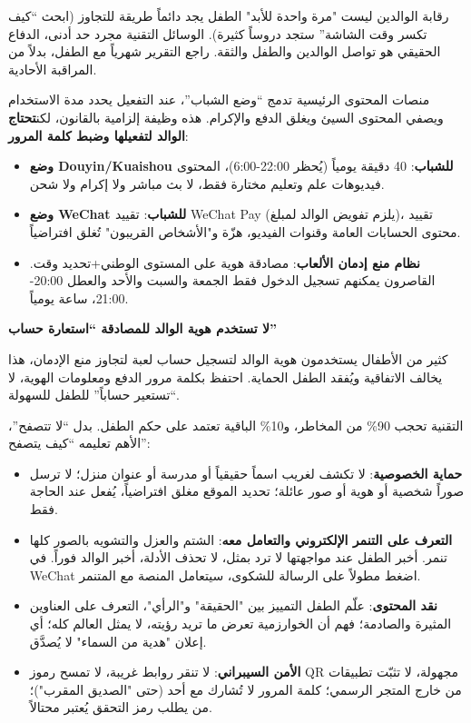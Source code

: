 \begin{tcbwarn}{رقابة الوالدين ليست "مرة واحدة للأبد"}
الطفل يجد دائماً طريقة للتجاوز (ابحث “كيف تكسر وقت الشاشة” ستجد دروساً كثيرة). الوسائل التقنية مجرد حد أدنى، الدفاع الحقيقي هو تواصل الوالدين والطفل والثقة. راجع التقرير شهرياً مع الطفل، بدلاً من المراقبة الأحادية.

\end{tcbwarn}


منصات المحتوى الرئيسية تدمج “وضع الشباب”، عند التفعيل يحدد مدة الاستخدام ويصفي المحتوى السيئ ويغلق الدفع والإكرام. هذه وظيفة إلزامية بالقانون، لكن\textbf{تحتاج الوالد لتفعيلها وضبط كلمة المرور}:

\begin{itemize}
  \item \textbf{وضع Douyin/Kuaishou للشباب}: 40 دقيقة يومياً (يُحظر 22:00-6:00)، المحتوى فيديوهات علم وتعليم مختارة فقط، لا بث مباشر ولا إكرام ولا شحن.
  \item \textbf{وضع WeChat للشباب}: تقييد WeChat Pay (يلزم تفويض الوالد لمبلغ)، تقييد محتوى الحسابات العامة وقنوات الفيديو، هزّة و"الأشخاص القريبون" تُغلق افتراضياً.
  \item \textbf{نظام منع إدمان الألعاب}: مصادقة هوية على المستوى الوطني+تحديد وقت. القاصرون يمكنهم تسجيل الدخول فقط الجمعة والسبت والأحد والعطل 20:00-21:00، ساعة يومياً.
\end{itemize}

\textbf{لا تستخدم هوية الوالد للمصادقة “استعارة حساب”}\par

كثير من الأطفال يستخدمون هوية الوالد لتسجيل حساب لعبة لتجاوز منع الإدمان، هذا يخالف الاتفاقية ويُفقد الطفل الحماية. احتفظ بكلمة مرور الدفع ومعلومات الهوية، لا “تستعير حساباً” للطفل للسهولة.


التقنية تحجب 90\% من المخاطر، و10\% الباقية تعتمد على حكم الطفل. بدل “لا تتصفح”، الأهم تعليمه “كيف يتصفح”:

\begin{itemize}
  \item \textbf{حماية الخصوصية}: لا تكشف لغريب اسماً حقيقياً أو مدرسة أو عنوان منزل؛ لا ترسل صوراً شخصية أو هوية أو صور عائلة؛ تحديد الموقع مغلق افتراضياً، يُفعل عند الحاجة فقط.
  \item \textbf{التعرف على التنمر الإلكتروني والتعامل معه}: الشتم والعزل والتشويه بالصور كلها تنمر. أخبر الطفل عند مواجهتها لا ترد بمثل، لا تحذف الأدلة، أخبر الوالد فوراً. في WeChat اضغط مطولاً على الرسالة للشكوى، سيتعامل المنصة مع المتنمر.
  \item \textbf{نقد المحتوى}: علّم الطفل التمييز بين "الحقيقة" و"الرأي"، التعرف على العناوين المثيرة والصادمة؛ فهم أن الخوارزمية تعرض ما تريد رؤيته، لا يمثل العالم كله؛ أي إعلان "هدية من السماء" لا يُصدَّق.
  \item \textbf{الأمن السيبراني}: لا تنقر روابط غريبة، لا تمسح رموز QR مجهولة، لا تثبّت تطبيقات من خارج المتجر الرسمي؛ كلمة المرور لا تُشارك مع أحد (حتى "الصديق المقرب")؛ من يطلب رمز التحقق يُعتبر محتالاً.
\end{itemize}

